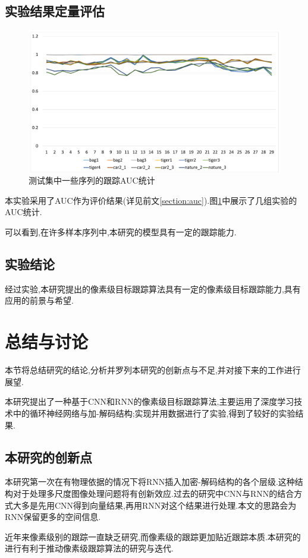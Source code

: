 \subsection{实验结果定量评估}
\par
\begin{figure}
    \centering
    \includegraphics[width = 1.\textwidth]{chap/img/res_auc.pdf}
    \caption{测试集中一些序列的跟踪AUC统计}
    \label{fig:res_auc}
\end{figure}
\par
本实验采用了AUC作为评价结果(详见前文\ref{section:auc}).图\ref{fig:res_auc}中展示了几组实验的AUC统计.
\par
可以看到,在许多样本序列中,本研究的模型具有一定的跟踪能力.
\subsection{实验结论}
经过实验,本研究提出的像素级目标跟踪算法具有一定的像素级目标跟踪能力,具有应用的前景与希望.

\section{总结与讨论}
本节将总结研究的结论,分析并罗列本研究的创新点与不足,并对接下来的工作进行展望.
\par
本研究提出了一种基于CNN和RNN的像素级目标跟踪算法,主要运用了深度学习技术中的循环神经网络与加-解码结构;实现并用数据进行了实验,得到了较好的实验结果.
\subsection{本研究的创新点}
本研究第一次在有物理依据的情况下将RNN插入加密-解码结构的各个层级.这种结构对于处理多尺度图像处理问题将有创新效应.过去的研究中CNN与RNN的结合方式大多是先用CNN得到向量结果,再用RNN对这个结果进行处理.本文的思路会为RNN保留更多的空间信息.
\par
近年来像素级别的跟踪一直缺乏研究,而像素级的跟踪更加贴近跟踪本质.本研究的进行有利于推动像素级跟踪算法的研究与迭代.
